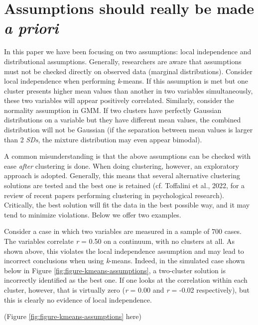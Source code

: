\documentclass[
  man,floatsintext]{apa7}
\begin{document}
\hypertarget{assumptions-should-really-be-made-a-priori}{%
\section{\texorpdfstring{Assumptions should really be made \emph{a priori}}{Assumptions should really be made a priori}}\label{assumptions-should-really-be-made-a-priori}}

In this paper we have been focusing on two assumptions: local independence and distributional assumptions. Generally, researchers are aware that assumptions must not be checked directly on observed data (marginal distributions). Consider local independence when performing \emph{k}-means. If this assumption is met but one cluster presents higher mean values than another in two variables simultaneously, these two variables will appear positively correlated. Similarly, consider the normality assumption in GMM. If two clusters have perfectly Gaussian distributions on a variable but they have different mean values, the combined distribution will not be Gaussian (if the separation between mean values is larger than 2 \emph{SDs}, the mixture distribution may even appear bimodal).

A common misunderstanding is that the above assumptions can be checked with ease \emph{after} clustering is done. When doing clustering, however, an exploratory approach is adopted. Generally, this means that several alternative clustering solutions are tested and the best one is retained (cf. Toffalini et al., 2022, for a review of recent papers performing clustering in psychological research). Critically, the best solution will fit the data in the best possible way, and it may tend to minimize violations. Below we offer two examples.

Consider a case in which two variables are measured in a sample of 700 cases. The variables correlate \emph{r} = 0.50 on a continuum, with no clusters at all. As shown above, this violates the local independence assumption and may lead to incorrect conclusions when using \emph{k}-means. Indeed, in the simulated case shown below in Figure \ref{fig:figure-kmeans-assumptions}, a two-cluster solution is incorrectly identified as the best one. If one looks at the correlation within each cluster, however, that is virtually zero (\emph{r} = 0.00 and \emph{r} = -0.02 respectively), but this is clearly no evidence of local independence.

(Figure \ref{fig:figure-kmeans-assumptions} here)
\end{document}
